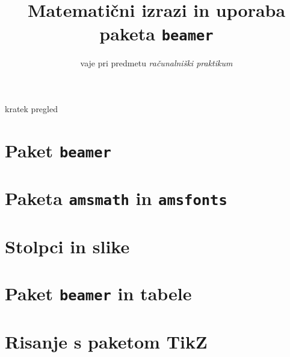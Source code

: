\documentclass{beamer}
\begin{document}

\title{Matematični izrazi in uporaba paketa \texttt{beamer}}
\subtitle{vaje pri predmetu \emph{računalniški praktikum}}
\date{}
\begin{frame}
\titlepage
\end{frame}


\begin{frame}{kratek pregled}
\tableofcontents%
\end{frame}

\section{Paket \texttt{beamer}}

\section{Paketa \texttt{amsmath} in \texttt{amsfonts}}

\section{Stolpci in slike}

\section{Paket \texttt{beamer} in tabele}

\section{Risanje s paketom TikZ}

\end{document}
